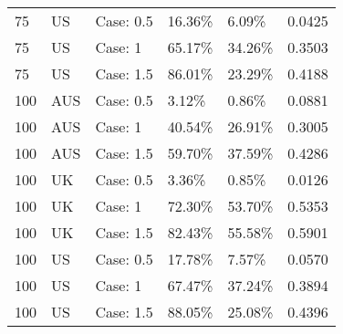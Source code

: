\begin{table}[ht]
\begin{tabular}{llllll}
  75 & US & Case: 0.5 & 16.36\% & 6.09\% & 0.0425 \\ 
  75 & US & Case: 1 & 65.17\% & 34.26\% & 0.3503 \\ 
  75 & US & Case: 1.5 & 86.01\% & 23.29\% & 0.4188 \\ 
  100 & AUS & Case: 0.5 & 3.12\% & 0.86\% & 0.0881 \\ 
  100 & AUS & Case: 1 & 40.54\% & 26.91\% & 0.3005 \\ 
  100 & AUS & Case: 1.5 & 59.70\% & 37.59\% & 0.4286 \\ 
  100 & UK & Case: 0.5 & 3.36\% & 0.85\% & 0.0126 \\ 
  100 & UK & Case: 1 & 72.30\% & 53.70\% & 0.5353 \\ 
  100 & UK & Case: 1.5 & 82.43\% & 55.58\% & 0.5901 \\ 
  100 & US & Case: 0.5 & 17.78\% & 7.57\% & 0.0570 \\ 
  100 & US & Case: 1 & 67.47\% & 37.24\% & 0.3894 \\ 
  100 & US & Case: 1.5 & 88.05\% & 25.08\% & 0.4396 \\ 
   \hline
\end{tabular}
\end{table}
